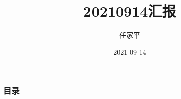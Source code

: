\documentclass[12pt, utf-8]{beamer}
\title{20210914汇报}
\author{任家平}
\institute{同济大学测绘与地理信息学院}
\date{2021-09-14}
\begin{document}
\begin{frame}
    \titlepage
\end{frame}

\begin{frame}
    \frametitle{目录}
    \tableofcontents
\end{frame}





% 
\end{document}
